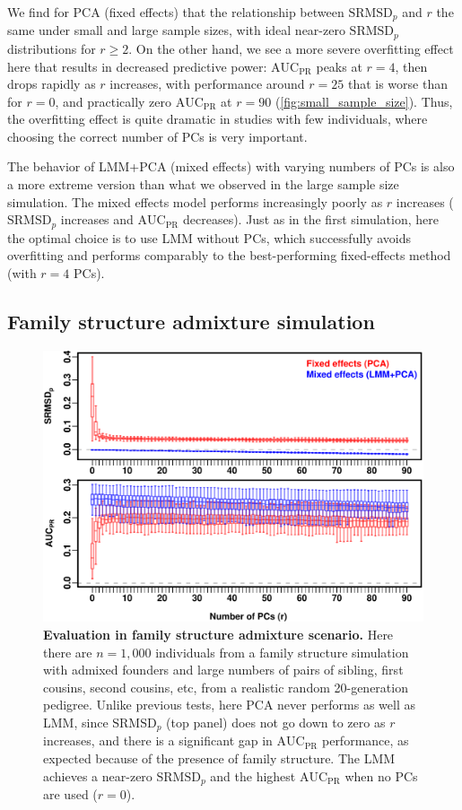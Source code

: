 \documentclass[11pt]{article}
\newcommand{\rmsd}{\text{SRMSD}_p}
\newcommand{\auc}{\text{AUC}_\text{PR}}
\begin{document}
We find for PCA (fixed effects) that the relationship between $\rmsd$ and $r$ the same under small and large sample sizes, with ideal near-zero $\rmsd$ distributions for $r \ge 2$.
On the other hand, we see a more severe overfitting effect here that results in decreased predictive power: $\auc$ peaks at $r = 4$, then drops rapidly as $r$ increases, with performance around $r = 25$ that is worse than for $r = 0$, and practically zero $\auc$ at $r = 90$ (\cref{fig:small_sample_size}).
Thus, the overfitting effect is quite dramatic in studies with few individuals, where choosing the correct number of PCs is very important.

The behavior of LMM+PCA (mixed effects) with varying numbers of PCs is also a more extreme version than what we observed in the large sample size simulation.
The mixed effects model performs increasingly poorly as $r$ increases ($\rmsd$ increases and $\auc$ decreases).
Just as in the first simulation, here the optimal choice is to use LMM without PCs, which successfully avoids overfitting and performs comparably to the best-performing fixed-effects method (with $r=4$ PCs).



\subsection{Family structure admixture simulation}

\begin{figure}[bp!]
  \centering
  \includegraphics[width=6in]{../data/sim-n1000-k10-f0.1-s0.5-g20/sum-rmsd-auc.pdf}
  \caption{
    {\bf Evaluation in family structure admixture scenario.}
    Here there are $n = 1,000$ individuals from a family structure simulation with admixed founders and large numbers of pairs of sibling, first cousins, second cousins, etc, from a realistic random 20-generation pedigree.
    Unlike previous tests, here PCA never performs as well as LMM, since $\rmsd$ (top panel) does not go down to zero as $r$ increases, and there is a significant gap in $\auc$ performance, as expected because of the presence of family structure.
    The LMM achieves a near-zero $\rmsd$ and the highest $\auc$ when no PCs are used ($r=0$).
  }
  \label{fig:family_structure}
\end{figure}
\end{document}
